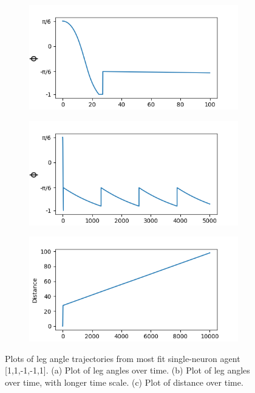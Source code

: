 \documentclass{article}
\begin{document}
\begin{figure}[htbp]
  \centering
  \begin{subfigure}[b]{0.32\textwidth}
    \centering
    \includegraphics[width=\textwidth]{../plots/angleTime1_170.png}
    \caption{}
    \label{fig:angleTimePlot1Best}
  \end{subfigure}
  \begin{subfigure}[b]{0.32\textwidth}
    \centering
    \includegraphics[width=\textwidth]{../plots/angleTime1_170_LONG.png}
    \caption{}
    \label{fig:angleTimePlot1BestLong}
  \end{subfigure}
  \begin{subfigure}[b]{0.32\textwidth}
    \centering
    \includegraphics[width=\textwidth]{../plots/dist_170_LONG_X.png}
    \caption{}
    \label{fig:distPlot1Best}
  \end{subfigure}
  \caption{Plots of leg angle trajectories from most fit single-neuron agent [1,1,-1,-1,1]. (a) Plot of leg angles over time. (b) Plot of leg angles over time, with longer time scale. (c) Plot of distance over time.}
  \label{fig:angleTimePlots1Best}
\end{figure}
\end{document}
